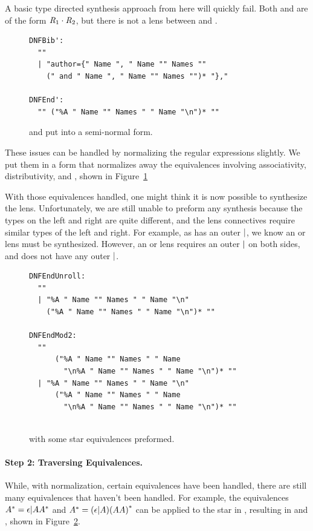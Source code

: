 \documentclass[numbers]{sigplanconf}
\begin{document}
A basic type directed synthesis approach from here will quickly fail.
Both 
and  are of the form $\mathit{R}_1\cdot\mathit{R}_2$, but there is
not a lens between  and
.

\begin{figure}
\begin{lstlisting}
DNFBib':
  ""
  | "author={" Name ", " Name "" Names ""
    (" and " Name ", " Name "" Names "")* "},"

DNFEnd':
  "" ("%A " Name "" Names " " Name "\n")* ""
\end{lstlisting}
\label{fig:examples-expanded-normalized}
\caption{
   and  put into a semi-normal form.
}
\end{figure}

These issues can be handled by normalizing the regular expressions slightly.
We put them in a form that normalizes away the equivalences involving
associativity, distributivity, and \EmptyString{}, shown in
Figure~\ref{fig:examples-expanded-normalized}


With those equivalences handled, one might think it is now possible to
synthesize the lens.
Unfortunately, we are still unable to preform any synthesis because the types
on the left and right are quite different, and the lens connectives require
similar types of the left and right.
For example, as  has an outer $|$, we know an or lens must be
synthesized.
However, an or lens requires an outer $|$ on both sides, and  does
not have any outer $|$.

\begin{figure}
\begin{lstlisting}
DNFEndUnroll:
  ""
  | "%A " Name "" Names " " Name "\n"
    ("%A " Name "" Names " " Name "\n")* ""

DNFEndMod2:
  ""
      ("%A " Name "" Names " " Name
        "\n%A " Name "" Names " " Name "\n")* ""
  | "%A " Name "" Names " " Name "\n"
      ("%A " Name "" Names " " Name
        "\n%A " Name "" Names " " Name "\n")* ""
  
\end{lstlisting}
\label{fig:examples-star-equivalenced}
\caption{
   with some star equivalences preformed.
}
\end{figure}

\paragraph*{Step 2:  Traversing Equivalences.}
While, with normalization, certain equivalences have been handled, there are
still many equivalences that haven't been handled.
For example, the equivalences ${A}^*=\epsilon | A{A}^*$ and
${A}^*=(\epsilon | A){(AA)}^*$ can be applied to the star in
, resulting in  and , shown in
Figure~\ref{fig:examples-star-equivalenced}.
\end{document}
